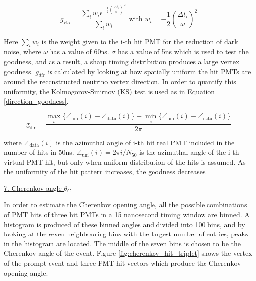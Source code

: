 \begin{equation}
g_{\mathrm{vtx}}=\frac{\sum_{i} w_{i} \mathrm{e}^{-\frac{1}{2}(\frac{\Delta t_{i}}{\sigma})^{2}}}{\sum_{i} w_{i}} \text { with } w_{i}=-\frac{1}{2}(\frac{\Delta t_{i}}{\omega})^{2}
\label{eq:vertex_goodness}
\end{equation}

Here $\sum_{i} w_{i}$ is the weight given to the i-th hit PMT for the reduction of dark noise, where $\omega$ has a value of 60ns. $\sigma$ has a value of 5ns which is used to test the goodness, and as a result, a sharp timing distribution produces a large vertex goodness. $g_{dir}$ is calculated by looking at how spatially uniform the hit PMTs are around the reconstructed neutrino vertex direction. In order to quantify this uniformity, the Kolmogorov-Smirnov (KS) test is used as in Equation \ref{direction_goodness}.

\begin{equation}
    \mathrm{g}_{\mathrm{dir}}=\frac{\max _{i}\{\angle_{\mathrm{uni}}(i)-\angle_{\mathrm{data}}(i)\}-\min _{i}\{\angle_{\mathrm{uni}}(i)-\angle_{\mathrm{data}}(i)\}}{2 \pi}
\label{direction_goodness}
\end{equation}

where $\angle_{\mathrm{data}}(i)$ is the azimuthal angle of i-th hit real PMT included in the number of hits in 50ns. $\angle_{\mathrm{uni}}(i)=2 \pi i / N_{50}$ is the azimuthal angle of the i-th virtual PMT hit, but only when uniform distribution of the hits is assumed. As the uniformity of the hit pattern increases, the goodness decreases. 
 


\noindent
\underline{7. Cherenkov angle $\theta_{C}$}\\
\noindent

In order to estimate the Cherenkov opening angle, all the possible combinations of PMT hits of three hit PMTs in a 15 nanosecond timing window are binned. A histogram is produced of these binned angles and divided into 100 bins, and by looking at the seven neighbouring bins with the largest number of entries, peaks in the histogram are located. The middle of the seven bins is chosen to be the Cherenkov angle of the event. Figure \ref{fig:cherenkov_hit_triplet} shows the vertex of the prompt event and three PMT hit vectors which produce the Cherenkov opening angle. 

